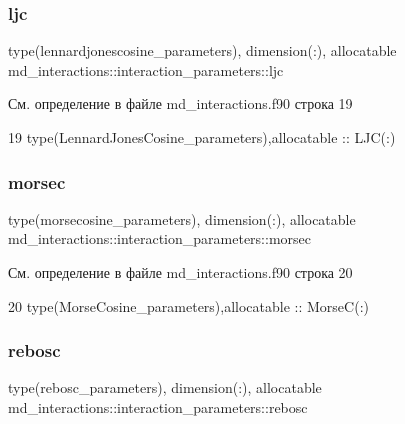 \subsubsection{\texorpdfstring{ljc}{ljc}}
{\footnotesize\ttfamily type(lennardjonescosine\+\_\+parameters), dimension(\+:), allocatable md\+\_\+interactions\+::interaction\+\_\+parameters\+::ljc}



См. определение в файле md\+\_\+interactions.\+f90 строка 19


\begin{DoxyCode}
19     \textcolor{keywordtype}{type}(LennardJonesCosine\_parameters),allocatable     :: LJC(:)
\end{DoxyCode}
\mbox{\label{structmd__interactions_1_1interaction__parameters_a38771bf0f6c0cd4ac46151171dd2b824}} 
\subsubsection{\texorpdfstring{morsec}{morsec}}
{\footnotesize\ttfamily type(morsecosine\+\_\+parameters), dimension(\+:), allocatable md\+\_\+interactions\+::interaction\+\_\+parameters\+::morsec}



См. определение в файле md\+\_\+interactions.\+f90 строка 20


\begin{DoxyCode}
20     \textcolor{keywordtype}{type}(MorseCosine\_parameters),allocatable            :: MorseC(:)
\end{DoxyCode}
\mbox{\label{structmd__interactions_1_1interaction__parameters_a165970e0061960e267d6812368a16ca1}} 
\subsubsection{\texorpdfstring{rebosc}{rebosc}}
{\footnotesize\ttfamily type(rebosc\+\_\+parameters), dimension(\+:), allocatable md\+\_\+interactions\+::interaction\+\_\+parameters\+::rebosc}



